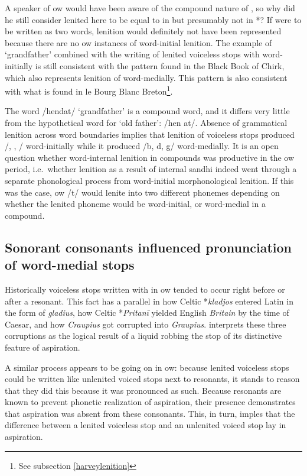 A speaker of \gls{ow} would have been aware of the compound nature of , so why did he still consider lenited  here to be equal to  in  but presumably not in *? If  were to be written as two words, lenition would definitely not have been represented because there are no \gls{ow} instances of word-initial lenition. The example of  `grandfather' combined with the writing of lenited voiceless stops with  word-initially is still consistent with the pattern found in the Black Book of Chirk, which also represents lenition of  word-medially. This pattern is also consistent with what is found in le Bourg Blanc Breton\footnote{See subsection \ref{harveylenition}}. 

The word  /hendat/ `grandfather' is a compound word, and it differs very little from the hypothetical word for `old father':  /hen \dd at/. Absence of grammatical lenition across word boundaries implies that lenition of voiceless stops produced /\bd, \dd, \gd/ word-initially while it produced /b, d, g/ word-medially. It is an open question whether word-internal lenition in compounds was  productive in the \gls{ow} period, i.e.\ whether lenition as a result of internal sandhi indeed went through a separate phonological process from word-initial morphonological lenition. If this was the case, \gls{ow} /t/ would lenite into two different phonemes depending on whether the lenited phoneme would be word-initial, or word-medial in a compound. 

\subsection{Sonorant consonants influenced pronunciation of word-medial stops}
Historically voiceless stops written with  in \gls{ow} tended to occur right before or after a resonant. This fact has a parallel in how Celtic *\textit{kladjos} entered Latin in the form of \textit{gladius}, how Celtic *\textit{Pritanī} yielded English \textit{Britain} by the time of Caesar, and how \textit{Craupius} got corrupted into \textit{Graupius}. \textcite[\S 25]{koch_*cothairche_1990} interprets these three corruptions as the logical result of a liquid robbing the stop of its distinctive feature of aspiration.

A similar process appears to be going on in \gls{ow}: because lenited voiceless stops could be written like unlenited voiced stops next to resonants, it stands to reason that they did this because it was pronounced as such. Because resonants are known to prevent phonetic realization of aspiration, their presence demonstrates that  aspiration was absent from these consonants. This, in turn, imples that the difference between a lenited voiceless stop and an unlenited voiced stop lay in aspiration.

